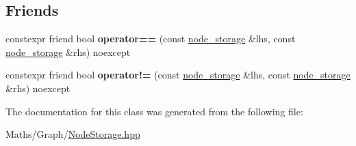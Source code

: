 \subsection*{Friends}
\begin{DoxyCompactItemize}
\item 
\mbox{\label{classsequoia_1_1maths_1_1graph__impl_1_1node__storage_3_01_weight_proxy_00_01_traits_00_01true_01_4_a06f08cf1474603966fb9b8073a021bce}} 
constexpr friend bool {\bfseries operator==} (const \mbox{\hyperlink{classsequoia_1_1maths_1_1graph__impl_1_1node__storage}{node\+\_\+storage}} \&lhs, const \mbox{\hyperlink{classsequoia_1_1maths_1_1graph__impl_1_1node__storage}{node\+\_\+storage}} \&rhs) noexcept
\item 
\mbox{\label{classsequoia_1_1maths_1_1graph__impl_1_1node__storage_3_01_weight_proxy_00_01_traits_00_01true_01_4_aadb76b8281355264d7a981e1bf7a2e78}} 
constexpr friend bool {\bfseries operator!=} (const \mbox{\hyperlink{classsequoia_1_1maths_1_1graph__impl_1_1node__storage}{node\+\_\+storage}} \&lhs, const \mbox{\hyperlink{classsequoia_1_1maths_1_1graph__impl_1_1node__storage}{node\+\_\+storage}} \&rhs) noexcept
\end{DoxyCompactItemize}


The documentation for this class was generated from the following file\+:\begin{DoxyCompactItemize}
\item 
Maths/\+Graph/\mbox{\hyperlink{_node_storage_8hpp}{Node\+Storage.\+hpp}}\end{DoxyCompactItemize}
